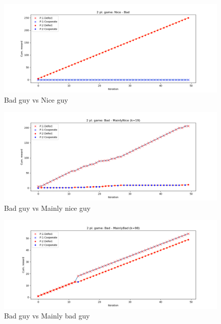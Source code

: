 \documentclass[journal,a4paper,10pt,twoside]{IEEEtran}
\begin{document}
\begin{figure}[ht]
    \centering
    \includegraphics[width=1\columnwidth]{../img_v1/idp2p-rewards-Nice-Bad.png}
    \caption{Bad guy vs Nice guy}
    \label{fig:badvsnice}
\end{figure}

\begin{figure}[ht]
    \centering
    \includegraphics[width=1\columnwidth]{../img_v1/idp2p-rewards-Bad-MainlyNice (k=19).png}
    \caption{Bad guy vs Mainly nice guy}
    \label{fig:badvsmainlynice}
\end{figure}

\begin{figure}[ht]
    \centering
    \includegraphics[width=1\columnwidth]{../img_v1/idp2p-rewards-Bad-MainlyBad (k=98).png}
    \caption{Bad guy vs Mainly bad guy}
    \label{fig:badvsmainlybad}
\end{figure}
\end{document}
